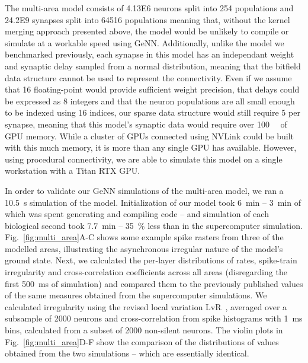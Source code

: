 \documentclass[9pt,twocolumn,twoside,lineno]{pnas-new}
\begin{document}
The multi-area model consists of \num{4.13E6} neurons split into \num{254} populations and \num{24.2E9} synapses split into \num{64516} populations meaning that, without the kernel merging approach presented above, the model would be unlikely to compile or simulate at a workable speed using GeNN.
Additionally, unlike the model we benchmarked previously, each synapse in this model has an independant weight and synaptic delay sampled from a normal distribution, meaning that the bitfield data structure cannot be used to represent the connectivity.
Even if we assume that \SI{16}{\bit} floating-point would provide sufficient weight precision, that delays could be expressed as \SI{8}{\bit} integers and that the neuron populations are all small enough to be indexed using \SI{16}{\bit} indices, our sparse data structure would still require \SI{5}{\byte} per synapse, meaning that this model's synaptic data would require over \SI{100}{\giga\byte} of GPU memory.
While a cluster of GPUs connected using NVLink could be built with this much memory, it is more than any single GPU has available.
However, using procedural connectivity, we are able to simulate this model on a single workstation with a Titan RTX GPU.

In order to validate our GeNN simulations of the multi-area model, we ran a \SI{10.5}{\second} simulation of the model.
Initialization of our model took \SI{6}{\minute} -- \SI{3}{\minute} of which was spent generating and compiling code -- and simulation of each biological second took \SI{7.7}{\minute} -- \SI{35}{\percent} less than in the supercomputer simulation.
Fig.~\ref{fig:multi_area}A-C shows some example spike rasters from three of the modelled areas, illustrating the asynchronous irregular nature of the model's ground state.
Next, we calculated the per-layer distributions of rates, spike-train irregularity and cross-correlation coefficients across all areas (disregarding the first \SI{500}{\milli\second} of simulation) and compared them to the previously published values of the same measures obtained from the supercomputer simulations.
We calculated irregularity using the revised local variation LvR~\citep{Shinomoto2009}, averaged over a subsample of \num{2000} neurons and cross-correlation from spike histograms with \SI{1}{\milli\second} bins, calculated from a subset of \num{2000} non-silent neurons.
The violin plots in Fig.~\ref{fig:multi_area}D-F show the comparison of the distributions of values obtained from the two simulations -- which are essentially identical.
%
\end{document}

